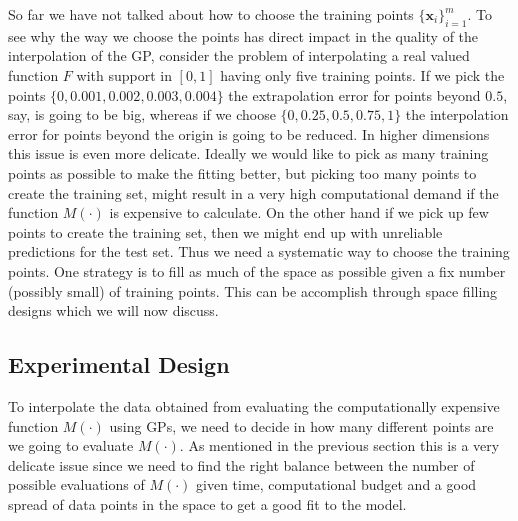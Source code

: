 \documentclass[12pt]{book}
\newcommand{\x}{\textbf{x}}
\begin{document}
So far we have not talked about how to choose the training points $\{\x_{i}\}_{i=1}^{m}$. To see
why the way we choose the points has direct impact in the quality of the interpolation of the GP,
consider the problem of interpolating a real valued function $F$ with support in $[0,1]$ having only five training
points. If we pick the points $\{0,0.001,0.002,0.003,0.004\}$ the extrapolation error for points beyond $0.5$, say,
is going to be big, whereas if we choose $\{0,0.25,0.5,0.75,1\}$ the interpolation error for points beyond
the origin is going to be reduced. In higher dimensions this issue is even more delicate.  Ideally 
we would like to pick as many training points as possible to make the fitting better, but picking too many points
to create the training set, might result in a very high computational demand if the function $M(\cdot)$ is expensive
to calculate. On the other hand if we pick up
 few points to create the training set, then we  might end up with unreliable predictions for the test
set. Thus we need a systematic way to choose  the training points. One strategy is to  
 fill as much of the space as possible given a fix number (possibly small) of  training points. 
This can be accomplish
through    space filling designs which we will now discuss. 
\newline

\subsection{Experimental Design }


 To interpolate the data obtained from evaluating the computationally expensive function
$M(\cdot)$ using GPs, we need to decide in how many different points are we going to evaluate $M(\cdot)$. 
As mentioned in the previous section this is a very delicate issue since we need to find 
the right balance between
the number of possible evaluations of $M(\cdot)$ given time, computational budget 
 and a good spread of data points in the space to get a good
fit to the model.
\newline
 
\end{document}
